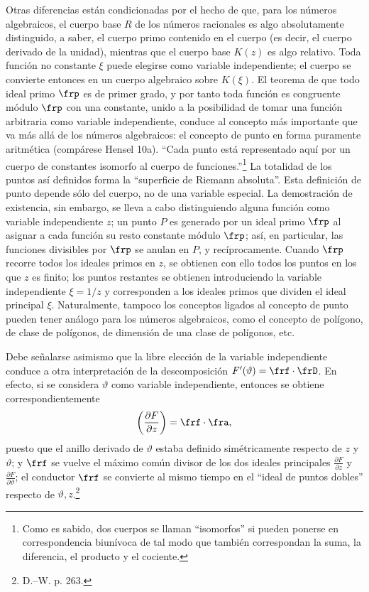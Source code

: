 \documentclass[11pt]{article}
\providecommand{\p}{\partial}
\begin{document}
Otras diferencias están condicionadas por el hecho de que, para los números algebraicos, el cuerpo base \(R\) de los números racionales es algo absolutamente distinguido, a saber, el cuerpo primo contenido en el cuerpo (es decir, el cuerpo derivado de la unidad), mientras que el cuerpo base \(K(z)\) es algo relativo. Toda función no constante \(\xi\) puede elegirse como variable independiente; el cuerpo se convierte entonces en un cuerpo algebraico sobre \(K(\xi)\). El teorema de que todo ideal primo \(\frp\) es de primer grado, y por tanto toda función es congruente módulo \(\frp\) con una constante, unido a la posibilidad de tomar una función arbitraria como variable independiente, conduce al concepto más importante que va más allá de los números algebraicos: el concepto de punto en forma puramente aritmética (compárese Hensel 10a). ``Cada punto está representado aquí por un cuerpo de constantes isomorfo al cuerpo de funciones.''\footnote{Como es sabido, dos cuerpos se llaman ``isomorfos'' si pueden ponerse en correspondencia biunívoca de tal modo que también correspondan la suma, la diferencia, el producto y el cociente.} La totalidad de los puntos así definidos forma la ``superficie de Riemann absoluta''. Esta definición de punto depende sólo del cuerpo, no de una variable especial. La demostración de existencia, sin embargo, se lleva a cabo distinguiendo alguna función como variable independiente \(z\); un punto \(P\) es generado por un ideal primo \(\frp\) al asignar a cada función su resto constante módulo \(\frp\); así, en particular, las funciones divisibles por \(\frp\) se anulan en \(P\), y recíprocamente. Cuando \(\frp\) recorre todos los ideales primos en \(z\), se obtienen con ello todos los puntos en los que \(z\) es finito; los puntos restantes se obtienen introduciendo la variable independiente \(\xi=1/z\) y corresponden a los ideales primos que dividen el ideal principal \(\xi\). Naturalmente, tampoco los conceptos ligados al concepto de punto pueden tener análogo para los números algebraicos, como el concepto de polígono, de clase de polígonos, de dimensión de una clase de polígonos, etc.

Debe señalarse asimismo que la libre elección de la variable independiente conduce a otra interpretación de la descomposición \(F'(\vartheta)=\frf\cdot\frD\). En efecto, si se considera \(\vartheta\) como variable independiente, entonces se obtiene correspondientemente
\[
\left(\frac{\p F}{\p z}\right)=\frf\cdot\fra,
\]
puesto que el anillo derivado de \(\vartheta\) estaba definido simétricamente respecto de \(z\) y \(\vartheta\); y \(\frf\) se vuelve el máximo común divisor de los dos ideales principales \(\frac{\p F}{\p z}\) y \(\frac{\p F}{\p\vartheta}\); el conductor \(\frf\) se convierte al mismo tiempo en el ``ideal de puntos dobles'' respecto de \(\vartheta,z\).\footnote{D.--W. p. 263.}
\end{document}
